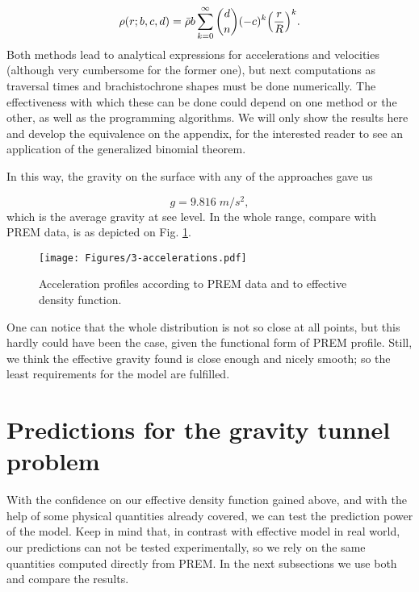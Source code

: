 \documentclass[aps,twocolumn,showpacs,preprintnumbers]{revtex4}
\begin{document}
     \begin{equation*}
        \rho(r; b,c,d) = \Bar{\rho} b \sum_{k= 0}^{\infty} \binom{d}{n} (-c)^k \qty( \frac{r}{R} )^k.
    \end{equation*}
    Both methods lead to analytical expressions for accelerations and velocities (although very cumbersome for the former one), but next computations as traversal times and brachistochrone shapes must be done numerically. The effectiveness with which these can be done could depend on one method or the other, as well as the programming algorithms. We will only show the results here and develop the equivalence on the appendix, for the interested reader to see an application of the generalized binomial theorem.
    
    In this way, the gravity on the surface with any of the approaches gave us
    
    \begin{equation*}
        g = 9.816 \; m/s^2,
    \end{equation*}
    which is the average gravity at see level. In the whole range, compare with PREM data, is as depicted on Fig. \ref{fig: 1- gravity}.
    
    \begin{figure}
        \centering
        \texttt{[image: Figures/3-accelerations.pdf]}
        \caption{Acceleration profiles according to PREM data and to effective density function.} 
        \label{fig: 1- gravity}
    \end{figure}
    
    One can notice that the whole distribution is not so close at all points, but this hardly could have been the case, given the functional form of PREM profile. Still, we think the effective gravity found is close enough and nicely smooth; so the least requirements for the model are fulfilled. 
    
\section{Predictions for the gravity tunnel problem}   \label{Predictions section}

With the confidence on our effective density function gained above, and with the help of some physical quantities already covered, we can test the prediction power of the model. Keep in mind that, in contrast with effective model in real world, our predictions can not be tested experimentally, so we rely on the same quantities computed directly from PREM. In the next subsections we use both and compare the results.
    
\end{document}
